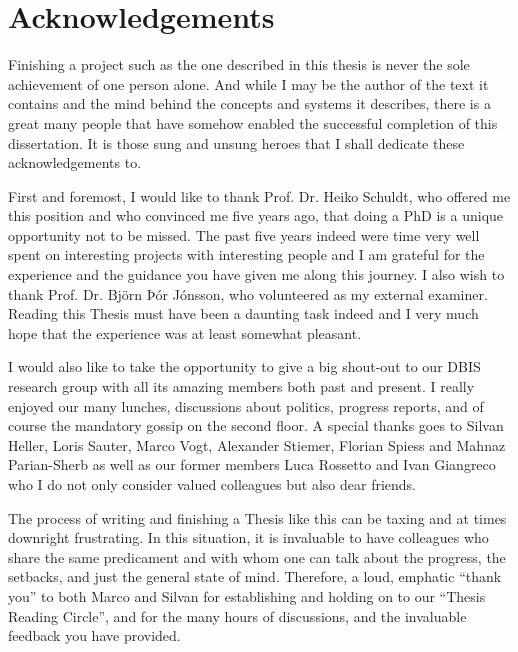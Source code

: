 
\chapter{Acknowledgements}

Finishing a project such as the one described in this thesis is never the sole achievement of one person alone. And while I may be the author of the text it contains and the mind behind the concepts and systems it describes, there is a great many people that have somehow enabled the successful completion of this dissertation. It is those sung and unsung heroes that I shall dedicate these acknowledgements to.

First and foremost, I would like to thank Prof. Dr. Heiko Schuldt, who offered me this position and who convinced me five years ago, that doing a PhD is a unique opportunity not to be missed. The past five years indeed were time very well spent on interesting projects with interesting people and I am grateful for the experience and the guidance you have given me along this journey. I also wish to thank Prof. Dr. Björn Þór Jónsson, who volunteered as my external examiner. Reading this Thesis must have been a daunting task indeed and I very much hope that the experience was at least somewhat pleasant.

I would also like to take the opportunity to give a big shout-out to our DBIS research group with all its amazing members both past and present. I really enjoyed our many lunches, discussions about politics, progress reports, and of course the mandatory gossip on the second floor. A special thanks goes to Silvan Heller, Loris Sauter, Marco Vogt, Alexander Stiemer, Florian Spiess and Mahnaz Parian-Sherb as well as our former members Luca Rossetto and Ivan Giangreco who I do not only consider valued colleagues but also dear friends.  

The process of writing and finishing a Thesis like this can be taxing and at times downright frustrating. In this situation, it is invaluable to have colleagues who share the same predicament and with whom one can talk about the progress, the setbacks, and just the general state of mind. Therefore, a loud, emphatic ``thank you'' to both Marco and Silvan for establishing and holding on to our ``Thesis Reading Circle'', and for the many hours of discussions, and the invaluable feedback you have provided.

